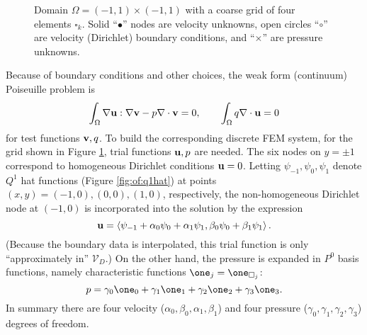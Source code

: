 \begin{figure}

\caption{Domain $\Omega=(-1,1)\times(-1,1)$ with a coarse grid of four elements $\square_k$.  Solid ``$\bullet$'' nodes are velocity unknowns, open circles ``{\large $\circ$}'' are velocity (Dirichlet) boundary conditions, and ``$\times$'' are pressure unknowns.}
\label{fig:ok:poiseuilletinygrid}
\end{figure}

Because of boundary conditions and other choices, the weak form (continuum) Poiseuille problem is
\begin{equation}
\int_\Omega \nabla \mathbf{u} : \nabla \mathbf{v} - p \nabla\cdot \mathbf{v} = 0, \qquad
\int_\Omega q \nabla\cdot \mathbf{u} = 0 \label{eq:ok:smallstokesboth}
\end{equation}
for test functions $\mathbf{v},q$.  To build the corresponding discrete FEM system, for the grid shown in Figure \ref{fig:ok:poiseuilletinygrid}, trial functions $\mathbf{u},p$ are needed.  The six nodes on $y=\pm 1$ correspond to homogeneous Dirichlet conditions $\mathbf{u}=0$.  Letting $\psi_{-1},\psi_0,\psi_1$ denote $Q^1$ hat functions (Figure \ref{fig:of:q1hat}) at points $(x,y)=(-1,0),(0,0),(1,0)$, respectively, the non-homogeneous Dirichlet node at $(-1,0)$ is incorporated into the solution by the expression
\begin{equation} 
\mathbf{u} = \left<\psi_{-1}+\alpha_0\psi_0+\alpha_1\psi_1,\beta_0\psi_0+\beta_1\psi_1\right>. \label{eq:ok:smallexpansionvelocity}
\end{equation}
(Because the boundary data is interpolated, this trial function is only ``approximately in'' $\mathcal{V}_D$.)  On the other hand, the pressure is expanded in $P^0$ basis functions, namely characteristic functions $\one_j = \one_{\square_j}$:
\begin{equation}
p = \gamma_0 \one_0 + \gamma_1 \one_1 + \gamma_2 \one_2 + \gamma_3 \one_3.  \label{eq:ok:smallexpansionpressure}
\end{equation}
In summary there are four velocity ($\alpha_0,\beta_0,\alpha_1,\beta_1$) and four pressure ($\gamma_0,\gamma_1,\gamma_2,\gamma_3$) degrees of freedom.

